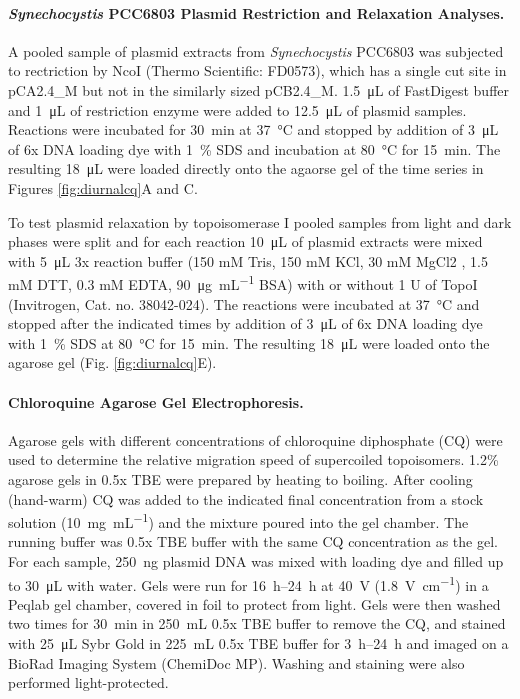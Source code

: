\documentclass[10pt,letterpaper]{article}
\newcommand{\ugml}{\micro\gram\per\milli\liter}
\newcommand{\mL}{\milli\liter}
\newcommand{\scyst}{\textit{Synechocystis} PCC6803}
\begin{document}
\paragraph{\scyst{} Plasmid Restriction and Relaxation Analyses.}
A pooled sample of plasmid extracts from \scyst{} was subjected to
rectriction by NcoI (Thermo Scientific: FD0573), which has a single
cut site in pCA2.4\_M but not in the similarly sized pCB2.4\_M.
\SI{1.5}{\uL} of FastDigest buffer and \SI{1}{\uL} of restriction
enzyme were added to \SI{12.5}{\uL} of plasmid samples. Reactions were
incubated for \SI{30}{\minute} at \SI{37}{\celsius} and stopped by
addition of \SI{3}{\uL} of 6x DNA loading dye with \SI{1}{\percent}
SDS and incubation at \SI{80}{\celsius} for \SI{15}{\minute}. The
resulting \SI{18}{\uL} were loaded directly onto the agaorse gel of
the time series in Figures \ref{fig:diurnalcq}A and C.

To test plasmid relaxation by topoisomerase I pooled samples from
light and dark phases were split and for each reaction \SI{10}{\uL} of
plasmid extracts were mixed with \SI{5}{\uL} 3x reaction buffer (150
mM Tris, 150 mM KCl, 30 mM MgCl2 , 1.5 mM DTT, 0.3 mM EDTA,
\SI{90}{\ugml} BSA) with or without 1 U of TopoI (Invitrogen,
Cat. no. 38042-024). The reactions were incubated at \SI{37}{\celsius}
and stopped after the indicated times by addition of \SI{3}{\uL} of 6x
DNA loading dye with \SI{1}{\percent} SDS at \SI{80}{\celsius} for
\SI{15}{\minute}. The resulting \SI{18}{\uL} were loaded onto the
agarose gel (Fig. \ref{fig:diurnalcq}E).

\paragraph{Chloroquine Agarose Gel Electrophoresis.}
Agarose gels with different concentrations of chloroquine diphosphate
(CQ) were used to determine the relative migration speed of
supercoiled topoisomers. 1.2\% agarose gels in 0.5x TBE were prepared
by heating to boiling. After cooling (hand-warm) CQ was added to the
indicated final concentration from a stock solution
(\SI{10}{\milli\gram\per\milli\liter}) and the mixture poured into the
gel chamber. The running buffer was 0.5x TBE buffer with the same CQ
concentration as the gel. For each sample, \SI{250}{\ng} plasmid DNA
was mixed with loading dye and filled up to \SI{30}{\uL} with water.
Gels were run for \SIrange{16}{24}{\hour} at \SI{40}{\volt}
(\SI{1.8}{\volt\per\cm}) in a Peqlab gel chamber, covered in foil to
protect from light. Gels were then washed two times for
\SI{30}{\minute} in \SI{250}{\mL} 0.5x TBE buffer to remove the CQ,
and stained with \SI{25}{\uL} Sybr Gold in \SI{225}{\mL} 0.5x TBE
buffer for \SIrange{3}{24}{\hour} and imaged on a BioRad Imaging
System (ChemiDoc MP). Washing and staining were also performed
light-protected.
\end{document}
